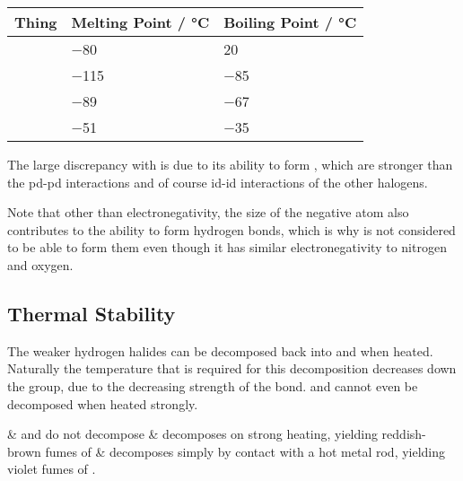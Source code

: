 			\begin{center}\begin{table}[htb]\renewcommand{\arraystretch}{1.5}
			\begin{tabu} to \textwidth {X[c,m] | X[c,m] | X[c,m]}

				Thing		&	Melting Point / \si{\celsius}	&	Boiling Point / \si{\celsius}	\\	\hline
						&	\num{-80}						&	\num{20}						\\	\hline
					&	\num{-115}						&	\num{-85}						\\	\hline
					&	\num{-89}						&	\num{-67}						\\	\hline
						&	\num{-51}						&	\num{-35}						\\	\hline

			\end{tabu}
			\end{table}\end{center}\vspace{-10mm}

			The large discrepancy with  is due to its ability to form , which are stronger than the pd-pd interactions
			and of course id-id interactions of the other halogens.

			Note that other than electronegativity, the size of the negative atom also contributes to the ability to form hydrogen bonds, which
			is why  is not considered to be able to form them even though it has similar electronegativity to nitrogen and oxygen.





		\subsection{Thermal Stability}

			The weaker hydrogen halides can be decomposed back into  and  when heated. Naturally the temperature that is required
			for this decomposition decreases down the group, due to the decreasing strength of the  bond.
			 and  cannot even be decomposed when heated strongly.

			\begin{bulletlist}
				&  and  do not decompose
				&  decomposes on strong heating, yielding reddish-brown fumes of 
				&  decomposes simply by contact with a hot metal rod, yielding violet fumes of .
			\end{bulletlist}

